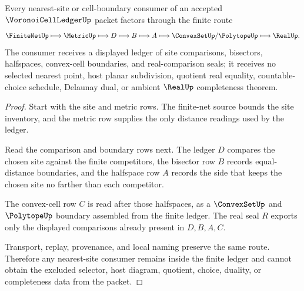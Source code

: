 \begin{theorem}
\label{thm:voronoi-cell-ledger-nearest-site-route}
Every nearest-site or cell-boundary consumer of an accepted $\VoronoiCellLedgerUp$ packet factors through the finite route
$$
\FiniteNetUp \longmapsto \MetricUp \longmapsto D \longmapsto B \longmapsto A \longmapsto \ConvexSetUp/\PolytopeUp \longmapsto \RealUp .
$$
The consumer receives a displayed ledger of site comparisons, bisectors, halfspaces, convex-cell boundaries, and real-comparison seals; it receives no selected nearest point, host planar subdivision, quotient real equality, countable-choice schedule, Delaunay dual, or ambient $\RealUp$ completeness theorem.
\end{theorem}
\begin{proof}
Start with the site and metric rows. The finite-net source bounds the site inventory, and the metric row supplies the only distance readings used by the ledger.

Read the comparison and boundary rows next. The ledger $D$ compares the chosen site against the finite competitors, the bisector row $B$ records equal-distance boundaries, and the halfspace row $A$ records the side that keeps the chosen site no farther than each competitor.

The convex-cell row $C$ is read after those halfspaces, as a $\ConvexSetUp$ and $\PolytopeUp$ boundary assembled from the finite ledger. The real seal $R$ exports only the displayed comparisons already present in $D,B,A,C$.

Transport, replay, provenance, and local naming preserve the same route. Therefore any nearest-site consumer remains inside the finite ledger and cannot obtain the excluded selector, host diagram, quotient, choice, duality, or completeness data from the packet.
\end{proof}


